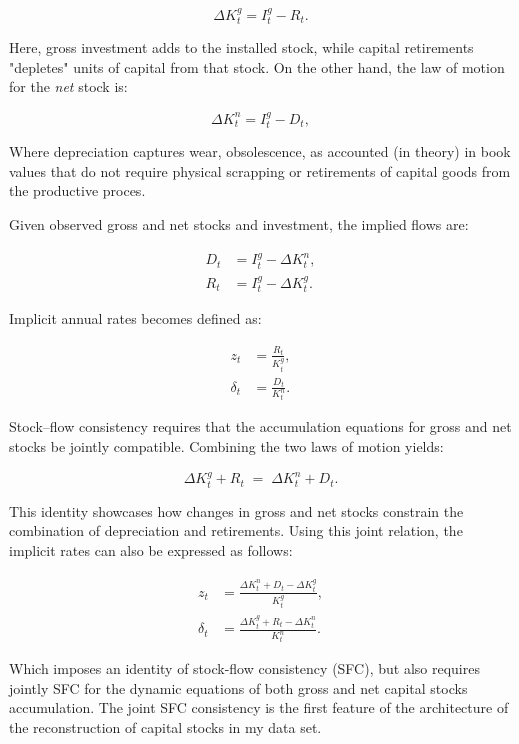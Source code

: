 \documentclass[11pt,a4paper]{article}
\begin{document}
\begin{equation}
\Delta K^{g}_{t} = I^{g}_{t} - R_{t}.
\end{equation}

Here, gross investment adds to the installed stock, while capital retirements "depletes" units of capital from that stock. On the other hand, the law of motion for the \emph{net} stock is:

\begin{equation}
\Delta K^{n}_{t} = I^{g}_{t} - D_{t},
\end{equation}

Where depreciation captures wear, obsolescence, as accounted (in theory) in book values that do not require physical scrapping or retirements of capital goods from the productive proces.  

Given observed gross and net stocks and investment, the implied flows are:

\begin{align}
D_{t} &= I^{g}_{t} - \Delta K^{n}_{t}, \\
R_{t} &= I^{g}_{t} - \Delta K^{g}_{t}.
\end{align}

Implicit annual rates becomes defined as: 

\begin{align}
z_{t} &= \frac{R_{t}}{K^{g}_{t}}, \\
\delta_{t} &= \frac{D_{t}}{K^{n}_{t}}.
\end{align}

Stock--flow consistency requires that the accumulation equations for gross and net stocks be jointly compatible. Combining the two laws of motion yields:

\begin{equation}
\Delta K^{g}_{t} + R_{t} \;=\; \Delta K^{n}_{t} + D_{t}.
\end{equation}

This identity showcases how changes in gross and net stocks constrain the combination of depreciation and retirements. Using this joint relation, the implicit rates can also be expressed as follows:

\begin{align}
z_{t} &= \frac{ \Delta K^{n}_{t} + D_{t} - \Delta K^{g}_{t} }{ K^{g}_{t} }, \\
\delta_{t} &= \frac{ \Delta K^{g}_{t} + R_{t} - \Delta K^{n}_{t} }{ K^{n}_{t} }.
\end{align}

Which imposes an identity of  stock-flow consistency (SFC), but also requires jointly SFC for the dynamic equations of both gross and net capital stocks accumulation. The joint SFC consistency is the first feature of the architecture of the reconstruction of capital stocks in my data set.  
\end{document}
